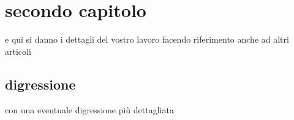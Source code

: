 \section{secondo capitolo}

e qui si danno i dettagli del vostro lavoro
\cite{paper1} facendo riferimento anche ad altri \cite{paper2} articoli

\subsection{digressione}
con una eventuale digressione pi\`u dettagliata






